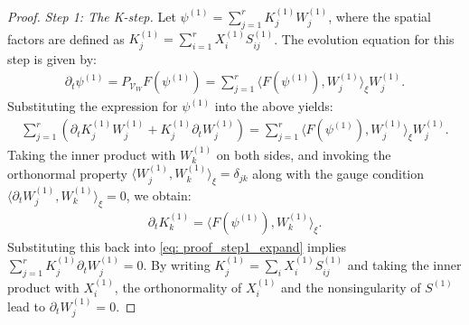 \documentclass[10pt,a4paper]{amsart}
\begin{document}
\begin{proof}
    \textit{Step 1: The K-step.} 
    Let $\psi^{(1)} = \sum_{j=1}^r K_j^{(1)} W_j^{(1)}$, where the spatial factors are defined as $K_j^{(1)} = \sum_{i=1}^r X_i^{(1)} S_{ij}^{(1)}$. The evolution equation for this step is given by:
    \begin{align*}
        \partial_t \psi^{(1)} = P_{\mathcal{V}_W} F(\psi^{(1)}) = \sum_{j=1}^r \langle F(\psi^{(1)}), W_j^{(1)} \rangle_{\xi} W_j^{(1)}.
    \end{align*} 
    Substituting the expression for $\psi^{(1)}$ into the above yields:
    \begin{align}\label{eq: proof_step1_expand}
        \sum_{j=1}^r \left( \partial_t K_j^{(1)} W_j^{(1)} + K_j^{(1)} \partial_t W_j^{(1)} \right) = \sum_{j=1}^r \langle F(\psi^{(1)}), W_j^{(1)} \rangle_{\xi} W_j^{(1)}.
    \end{align}
    Taking the inner product with $W_k^{(1)}$ on both sides, and invoking the orthonormal property $\langle W_j^{(1)}, W_k^{(1)} \rangle_{\xi} = \delta_{jk}$ along with the gauge condition $\langle \partial_t W_j^{(1)}, W_k^{(1)} \rangle_{\xi} = 0$, we obtain:
    \begin{align*}
        \partial_t K_k^{(1)} = \langle F(\psi^{(1)}), W_k^{(1)} \rangle_{\xi}.
    \end{align*}
    Substituting this back into \eqref{eq: proof_step1_expand} implies $\sum_{j=1}^r K_j^{(1)} \partial_t W_j^{(1)} = 0$. By writing $K_j^{(1)} = \sum_i X_i^{(1)} S_{ij}^{(1)}$ and taking the inner product with $X_i^{(1)}$, the orthonormality of $X_i^{(1)}$ and the nonsingularity of $S^{(1)}$ lead to $\partial_t W_j^{(1)} = 0$.


\end{proof}
\end{document}
